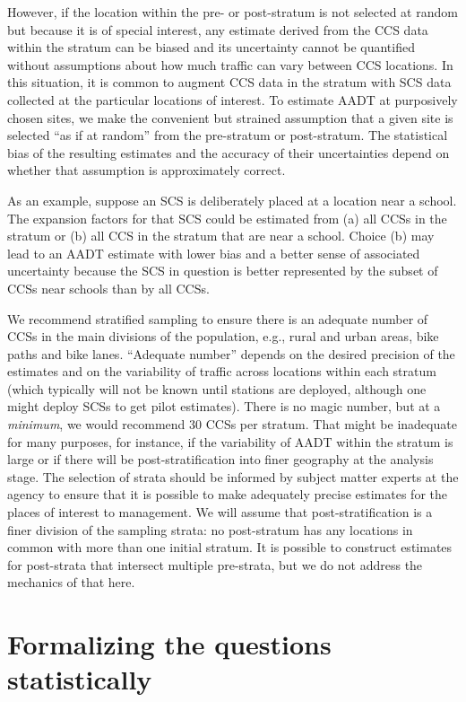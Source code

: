 \documentclass[11pt]{article}
\begin{document}
However, if the location within the pre- or post-stratum is not selected
at random but because it is of special interest, any estimate derived
from the CCS data within the stratum can be biased and its uncertainty
cannot be quantified without assumptions about how much traffic can vary
between CCS locations. In this situation, it is common to augment CCS
data in the stratum with SCS data collected at the particular locations
of interest. To estimate AADT at purposively chosen sites, we make the
convenient but strained assumption that a given site is selected ``as if
at random'' from the pre-stratum or post-stratum. The statistical bias
of the resulting estimates and the accuracy of their uncertainties
depend on whether that assumption is approximately correct.

As an example, suppose an SCS is deliberately placed at a location near
a school. The expansion factors for that SCS could be estimated from (a)
all CCSs in the stratum or (b) all CCS in the stratum that are near a
school. Choice (b) may lead to an AADT estimate with lower bias and a
better sense of associated uncertainty because the SCS in question is
better represented by the subset of CCSs near schools than by all CCSs.

We recommend stratified sampling to ensure there is an adequate number
of CCSs in the main divisions of the population, e.g., rural and urban
areas, bike paths and bike lanes. ``Adequate number'' depends on the
desired precision of the estimates and on the variability of traffic
across locations within each stratum (which typically will not be known
until stations are deployed, although one might deploy SCSs to get pilot
estimates). There is no magic number, but at a \emph{minimum}, we would
recommend 30 CCSs per stratum. That might be inadequate for many
purposes, for instance, if the variability of AADT within the stratum is
large or if there will be post-stratification into finer geography at
the analysis stage. The selection of strata should be informed by
subject matter experts at the agency to ensure that it is possible to
make adequately precise estimates for the places of interest to
management. We will assume that post-stratification is a finer division
of the sampling strata: no post-stratum has any locations in common with
more than one initial stratum. It is possible to construct estimates for
post-strata that intersect multiple pre-strata, but we do not address
the mechanics of that here.

    \section{Formalizing the questions
statistically}\label{formalizing-the-questions-statistically}
\end{document}

